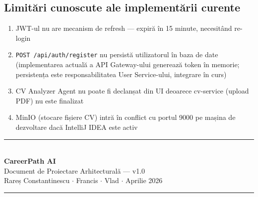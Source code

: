 \documentclass[12pt, a4paper]{report}
\begin{document}
\subsection{Limitări cunoscute ale implementării curente}

\begin{enumerate}[leftmargin=*, label=\textbf{L\arabic*.}]
  \item JWT-ul nu are mecanism de refresh — expiră în 15 minute, necesitând re-login
  \item \texttt{POST /api/auth/register} nu persistă utilizatorul în baza de date
        (implementarea actuală a API Gateway-ului generează token în memorie; persistența
        este responsabilitatea User Service-ului, integrare în curs)
  \item CV Analyzer Agent nu poate fi declanșat din UI deoarece cv-service (upload PDF)
        nu este finalizat
  \item MinIO (stocare fișiere CV) intră în conflict cu portul 9000 pe mașina de
        dezvoltare dacă IntelliJ IDEA este activ
\end{enumerate}

\clearpage
\begin{center}
\vspace*{3cm}
{\color{primary}\rule{10cm}{1pt}}\\[0.8cm]
{\large\bfseries\color{darkgray} CareerPath AI}\\[0.3cm]
{\color{muted} Document de Proiectare Arhitecturală — v1.0}\\[0.3cm]
{\small\color{muted} Rareș Constantinescu $\cdot$ Francis $\cdot$ Vlad $\cdot$ Aprilie 2026}\\[0.6cm]
{\color{primary}\rule{10cm}{1pt}}
\end{center}
\end{document}
